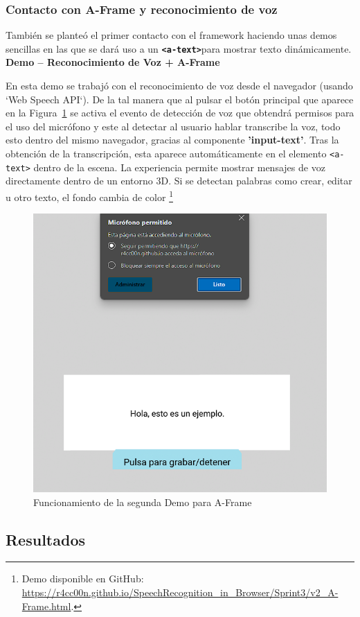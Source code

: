 \documentclass[a4paper, 12pt]{book}
\begin{document}
\subsubsection{Contacto con A-Frame y reconocimiento de voz}
También se planteó el primer contacto con el framework haciendo unas demos sencillas en las que se dará uso a un \textbf{\texttt{<a-text>}}para mostrar texto dinámicamente.
\textbf{Demo – Reconocimiento de Voz + A-Frame}

En esta demo se trabajó con el reconocimiento de voz desde el navegador (usando `Web Speech API`).
De la tal manera que al pulsar el botón principal que aparece en la Figura~\ref{fig:Demo1V2} se activa el evento de detección de voz que obtendrá permisos para el uso del micrófono y este al detectar al usuario hablar transcribe la voz, todo esto dentro del mismo navegador, gracias al componente \textbf{'input-text'}. 
Tras la obtención de la transcripción, esta aparece automáticamente en el elemento \texttt{<a-text>} dentro de la escena.
La experiencia permite mostrar mensajes de voz directamente dentro de un entorno 3D.
Si se detectan palabras como crear, editar u otro texto, el fondo cambia de color
\footnote{Demo disponible en GitHub: \url{https://r4cc00n.github.io/SpeechRecognition_in_Browser/Sprint3/v2_A-Frame.html}.}
\begin{figure}[H]  %
  \centering
  \includegraphics[width=0.5\linewidth]{img/Demo1_v2.png}  %
  \caption{Funcionamiento de la segunda Demo para A-Frame}  %
  \label{fig:Demo1V2}  %
\end{figure}  


\subsection{Resultados}
\end{document}

